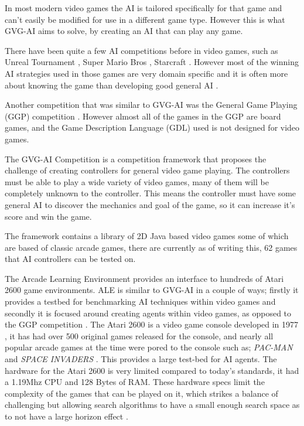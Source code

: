 \documentclass[journal]{IEEEtran}
\begin{document}
		In most modern video games the AI is tailored specifically for that game and can't easily be modified for use in a different game type. However this is what GVG-AI aims to solve, by creating an AI that can play any game. 
		
		There have been quite a few AI competitions before in video games, such as Unreal Tournament \cite{hingston2010new}, Super Mario Bros \cite{citationNeeded}, Starcraft \cite{ontanon2013survey}. 
		However most of the winning AI strategies used in those games are very domain specific and it is often more about knowing the game than developing good general AI \cite{perez20162014}. 
		 \par
		
		
		Another competition that was similar to GVG-AI was the General Game Playing (GGP) competition \cite{GGP2005general, love2008general}. However almost all of the games in the GGP are board games, and the Game Description Language (GDL) used is not designed for video games.
		
		The GVG-AI Competition is a competition framework that proposes the challenge of creating controllers for general video game playing. The controllers must be able to play a wide variety of video games, many of them will be completely unknown to the controller. This means the controller must have some general AI to discover the mechanics and goal of the game, so it can increase it's score and win the game. \cite{GVGAI, perez20162014}
		
		The framework contains a library of 2D Java based video games some of which are based of classic arcade games, there are currently as of writing this, 62 games that AI controllers can be tested on.

		The Arcade Learning Environment \cite{bellemare2013arcade} provides an interface to hundreds of Atari 2600 game environments. ALE is similar to GVG-AI in a couple of ways; firstly it provides a testbed for benchmarking AI techniques within video games and secondly it is focused around creating agents within video games, as opposed to the GGP competition \cite{GGP2005general}.
		The Atari 2600 is a video game console developed in 1977 , it has had over 500 original games released for the console, and nearly all popular arcade games at the time were pored to the console such as; \textit{PAC-MAN} and \textit{SPACE INVADERS} \cite{bellemare2013arcade}. This provides a large test-bed for AI agents.
		The hardware for the Atari 2600 is very limited compared to today's standards, it had a 1.19Mhz CPU and 128 Bytes of RAM. These hardware specs limit the complexity of the games that can be played on it, which strikes a balance of challenging but allowing search algorithms to have a small enough search space as to not have a large horizon effect \cite{bellemare2013arcade}.
		
\end{document}
